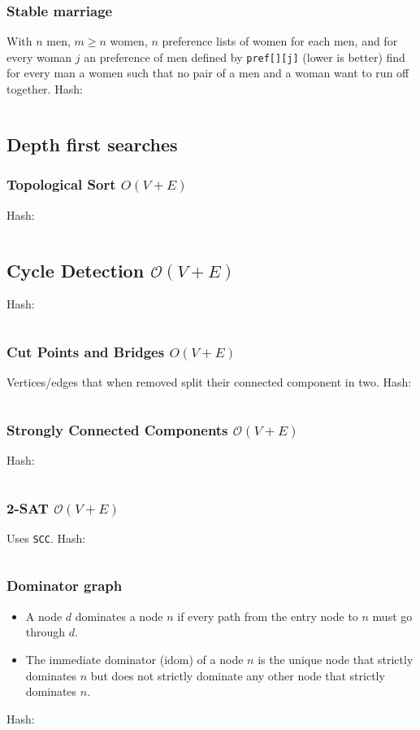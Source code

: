 \documentclass[9pt,a4paper,landscape,oneside]{amsart}
\newcommand{\mintedstyle}[2]{\inputminted{#1}{code/#2}}
\newcommand{\code}[1]{ Hash: 
\mintedstyle{cpp}{#1}}
\newenvironment{myitemize}
{\begin{itemize}[leftmargin=.3cm]
	\setlength{\itemsep}{0pt}
	\setlength{\parskip}{0pt}
	\setlength{\parsep}{0pt}     }
{ \end{itemize}                  }
\begin{document}
\begin{multicols*}{3}
\subsubsection{Stable marriage}
With $n$ men, $m \geq n$ women, $n$ preference lists of women for each men, and
for every woman $j$ an preference of men defined by \texttt{pref[][j]} (lower is better)
find for every man a women such that no pair of a men and a woman want to run off together.
\code{graphs/stable.cpp}

\subsection{Depth first searches}

\subsubsection{Topological Sort $O(V+E)$}
\code{graphs/toposort.cpp}

\subsection{Cycle Detection $\mathcal{O}(V + E)$}
\code{graphs/findcycle.cpp}

\subsubsection{Cut Points and Bridges $O(V+E)$}
Vertices/edges that when removed split their connected component in two.
\code{graphs/cut_points_and_bridges.cpp}

\subsubsection{Strongly Connected Components $\mathcal{O}(V + E)$}
\code{graphs/scc.cpp}

\subsubsection{2-SAT $\mathcal{O}(V+E)$}
Uses \texttt{SCC}.
\code{satsolver.cpp}

\subsubsection{Dominator graph}
\begin{myitemize}
\item
	A node $d$ dominates a node $n$ if every path from the entry node to $n$ must go through $d$.	
\item
	The immediate dominator (idom) of a node $n$ is the unique node that strictly dominates $n$ but does not strictly dominate any other node that strictly dominates $n$.
\end{myitemize}
\code{graphs/dominator.cpp}


\end{multicols*}
\end{document}
